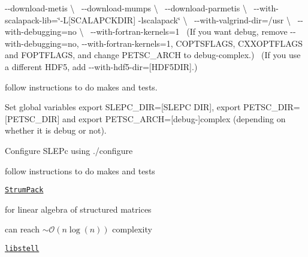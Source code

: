 \begin{DoxyItemize}
\begin{DoxyItemize}
\begin{DoxyEnumerate}
 {\ttfamily -\/-\/download-\/metis \textbackslash{}}~\newline
 {\ttfamily -\/-\/download-\/mumps \textbackslash{}}~\newline
 {\ttfamily -\/-\/download-\/parmetis \textbackslash{}}~\newline
 {\ttfamily -\/-\/with-\/scalapack-\/lib=\char`\"{}-\/\+L\mbox{[}\+S\+C\+A\+L\+A\+P\+C\+K\+D\+I\+R\mbox{]} -\/lscalapack\char`\"{} \textbackslash{}}~\newline
 {\ttfamily -\/-\/with-\/valgrind-\/dir=/usr \textbackslash{}}~\newline
 {\ttfamily -\/-\/with-\/debugging=no \textbackslash{}}~\newline
 {\ttfamily -\/-\/with-\/fortran-\/kernels=1}~\newline
 (If you want debug, remove {\ttfamily -\/-\/with-\/debugging=no}, {\ttfamily -\/-\/with-\/fortran-\/kernels=1}, C\+O\+P\+T\+S\+F\+L\+A\+GS, C\+X\+X\+O\+P\+T\+F\+L\+A\+GS and F\+O\+P\+T\+F\+L\+A\+GS, and change P\+E\+T\+S\+C\+\_\+\+A\+R\+CH to {\ttfamily debug-\/complex}.)~\newline
 (If you use a different H\+D\+F5, add {\ttfamily -\/-\/with-\/hdf5-\/dir=\mbox{[}H\+D\+F5\+D\+IR\mbox{]}}.)
\item follow instructions to do makes and tests.
\item Set global variables {\ttfamily export S\+L\+E\+P\+C\+\_\+\+D\+IR=\mbox{[}S\+L\+E\+PC D\+IR\mbox{]}}, {\ttfamily export P\+E\+T\+S\+C\+\_\+\+D\+IR=\mbox{[}P\+E\+T\+S\+C\+\_\+\+D\+IR\mbox{]}} and {\ttfamily export P\+E\+T\+S\+C\+\_\+\+A\+R\+CH=\mbox{[}debug-\/\mbox{]}complex} (depending on whether it is debug or not).
\item Configure S\+L\+E\+Pc using {\ttfamily ./configure}
\item follow instructions to do makes and tests
\end{DoxyEnumerate}
\end{DoxyItemize}
\item \href{http://portal.nersc.gov/project/sparse/strumpack/}{\tt Strum\+Pack}
\begin{DoxyItemize}
\item for linear algebra of structured matrices \cite{Ambikasaran2013}
\item can reach $\sim \mathcal{O} (n \log(n))$ complexity
\end{DoxyItemize}
\item \href{http://vmecwiki.pppl.wikispaces.net/STELLOPT+Compilation}{\tt libstell}
\begin{DoxyItemize}

\end{DoxyItemize}
\end{DoxyItemize}
